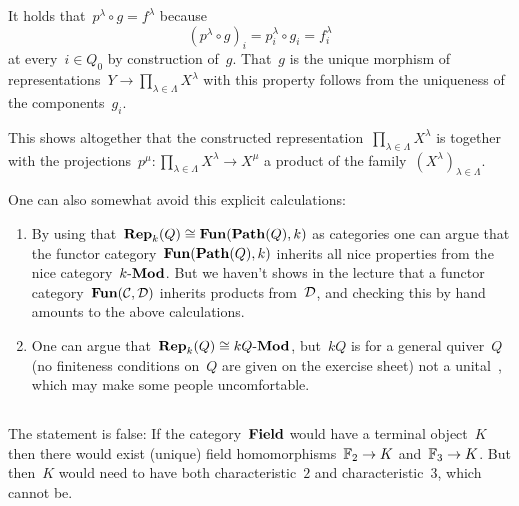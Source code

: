 It holds that~$p^\lambda \circ g = f^\lambda$ because
\[
    (p^\lambda \circ g)_i
  = p^\lambda_i \circ g_i
  = f^\lambda_i
\]
at every~$i \in Q_0$ by construction of~$g$.
That~$g$ is the unique morphism of representations~$Y \to \prod_{\lambda \in \Lambda} X^\lambda$ with this property follows from the uniqueness of the components~$g_i$.

This shows altogether that the constructed representation~$\prod_{\lambda \in \Lambda} X^\lambda$ is together with the projections~$p^\mu \colon \prod_{\lambda \in \Lambda} X^\lambda \to X^\mu$ a product of the family~$(X^\lambda)_{\lambda \in \Lambda}$.


\begin{remark}
  One can also somewhat avoid this explicit calculations:
  \begin{enumerate}
    \item
      By using that~$\mathbf{Rep}_{k}(Q) \cong \mathbf{Fun}(\mathbf{Path}(Q), k)$ as categories one can argue that the functor category~$\mathbf{Fun}(\mathbf{Path}(Q), k)$ inherits all nice properties from the nice category~$\text{$k$-$\mathbf{Mod}$}$.
      But we haven’t shows in the lecture that a functor category~$\mathbf{Fun}(\mathcal{C}, \mathcal{D})$ inherits products from~$\mathcal{D}$, and checking this by hand amounts to the above calculations.
    \item
      One can argue that~$\mathbf{Rep}_{k}(Q) \cong \text{$kQ$-$\mathbf{Mod}$}$, but~$kQ$ is for a general quiver~$Q$ (no finiteness conditions on~$Q$ are given on the exercise sheet) not a unital~{\kalg}, which may make some people uncomfortable.
  \end{enumerate}
\end{remark}





\subsection{}

The statement is false:
If the category~$\mathbf{Field}$ would have a terminal object~$K$ then there would exist (unique) field homomorphisms~$\mathbb{F}_2 \to K$ and~$\mathbb{F}_3 \to K$.
But then~$K$ would need to have both characteristic~$2$ and characteristic~$3$, which cannot be.




